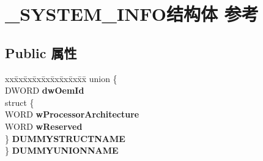 \hypertarget{struct___s_y_s_t_e_m___i_n_f_o}{}\section{\+\_\+\+S\+Y\+S\+T\+E\+M\+\_\+\+I\+N\+F\+O结构体 参考}
\label{struct___s_y_s_t_e_m___i_n_f_o}
\subsection*{Public 属性}
\begin{DoxyCompactItemize}
\item 
\mbox{\label{struct___s_y_s_t_e_m___i_n_f_o_ae1093494c2673cae9690d69df2a17d87}} 
\begin{tabbing}
xx\=xx\=xx\=xx\=xx\=xx\=xx\=xx\=xx\=\kill
union \{\\
\>DWORD {\bfseries dwOemId}\\
\>struct \{\\
\>\>WORD {\bfseries wProcessorArchitecture}\\
\>\>WORD {\bfseries wReserved}\\
\>\} {\bfseries DUMMYSTRUCTNAME}\\
\} {\bfseries DUMMYUNIONNAME}\\


\end{tabbing}
\end{DoxyCompactItemize}
